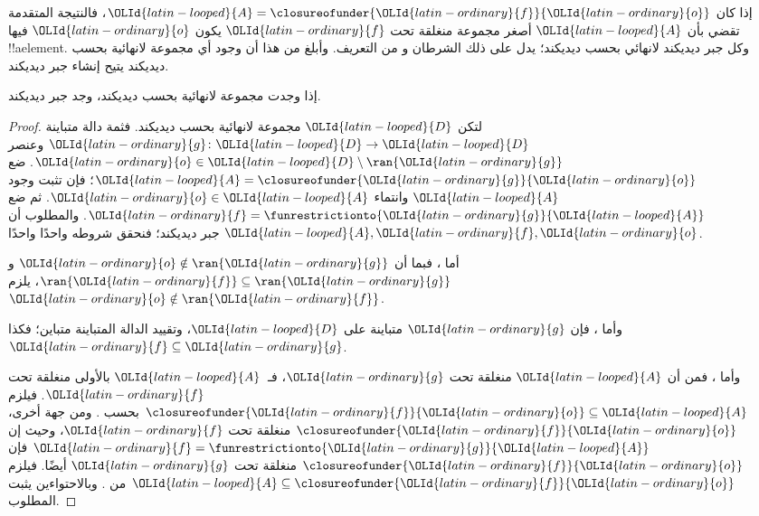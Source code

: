 \documentclass[../../../include/open-logic-section]{subfiles}
\begin{document}
إذا كان $\OLId{latin-looped}{A} = \closureofunder{\OLId{latin-ordinary}{f}}{\OLId{latin-ordinary}{o}}$، فالنتيجة المتقدمة تقضي بأن $\OLId{latin-looped}{A}$ أصغر مجموعة منغلقة تحت $\OLId{latin-ordinary}{f}$ يكون $\OLId{latin-ordinary}{o}$ فيها !!a{element}. وكل جبر ديديكند لانهائي بحسب ديديكند؛ يدل على ذلك الشرطان
 و من التعريف. وأبلغ من هذا أن وجود أي مجموعة لانهائية بحسب ديديكند يتيح إنشاء جبر ديديكند.

\begin{thm}
إذا وجدت مجموعة لانهائية بحسب ديديكند، وجد جبر ديديكند.
\end{thm}

\begin{proof}
لتكن $\OLId{latin-looped}{D}$ مجموعة لانهائية بحسب ديديكند. فثمة دالة متباينة $\OLId{latin-ordinary}{g} \colon \OLId{latin-looped}{D} \to
\OLId{latin-looped}{D}$ وعنصر $\OLId{latin-ordinary}{o}  \in \OLId{latin-looped}{D} \setminus \ran{\OLId{latin-ordinary}{g}}$. ضع $\OLId{latin-looped}{A} =
\closureofunder{\OLId{latin-ordinary}{g}}{\OLId{latin-ordinary}{o}}$؛ فإن  تثبت وجود $\OLId{latin-looped}{A}$ وانتماء
$\OLId{latin-ordinary}{o} \in \OLId{latin-looped}{A}$. ثم ضع $\OLId{latin-ordinary}{f} =
\funrestrictionto{\OLId{latin-ordinary}{g}}{\OLId{latin-looped}{A}}$. والمطلوب أن $\OLId{latin-looped}{A}, \OLId{latin-ordinary}{f}, \OLId{latin-ordinary}{o}$ جبر ديديكند؛ فنحقق شروطه واحدًا واحدًا.

أما ، فبما أن $\OLId{latin-ordinary}{o} \notin \ran{\OLId{latin-ordinary}{g}}$ و$\ran{\OLId{latin-ordinary}{f}}
\subseteq \ran{\OLId{latin-ordinary}{g}}$، يلزم $\OLId{latin-ordinary}{o}\notin \ran{\OLId{latin-ordinary}{f}}$.

وأما ، فإن $\OLId{latin-ordinary}{g}$ متباينة على $\OLId{latin-looped}{D}$، وتقييد الدالة المتباينة متباين؛ فكذا $\OLId{latin-ordinary}{f} \subseteq \OLId{latin-ordinary}{g}$.

وأما ، فمن  أن $\OLId{latin-looped}{A}$ منغلقة تحت $\OLId{latin-ordinary}{g}$، فـ~$\OLId{latin-looped}{A}$ بالأولى منغلقة تحت $\OLId{latin-ordinary}{f}$. فيلزم
$\closureofunder{\OLId{latin-ordinary}{f}}{\OLId{latin-ordinary}{o}} \subseteq \OLId{latin-looped}{A}$ بحسب .
ومن جهة أخرى، $\closureofunder{\OLId{latin-ordinary}{f}}{\OLId{latin-ordinary}{o}}$ منغلقة تحت $\OLId{latin-ordinary}{f}$، وحيث إن $\OLId{latin-ordinary}{f} =
\funrestrictionto{\OLId{latin-ordinary}{g}}{\OLId{latin-looped}{A}}$ فإن $\closureofunder{\OLId{latin-ordinary}{f}}{\OLId{latin-ordinary}{o}}$ منغلقة تحت $\OLId{latin-ordinary}{g}$ أيضًا. فيلزم
$\OLId{latin-looped}{A} \subseteq \closureofunder{\OLId{latin-ordinary}{f}}{\OLId{latin-ordinary}{o}}$ من
. وبالاحتواءين يثبت المطلوب.
\end{proof}
\end{document}
